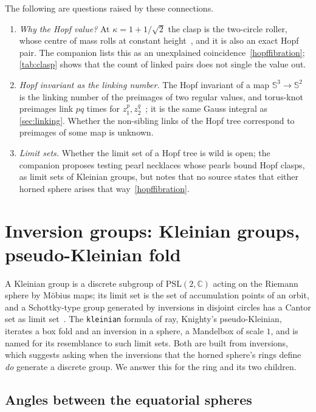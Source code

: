 \documentclass[11pt,a4paper]{article}
\theoremstyle{remark}
\newcommand{\C}{\mathbb{C}}
\newcommand{\Sph}{\mathbb{S}}
\newcommand{\code}[1]{\texttt{#1}}
\begin{document}
The following are questions raised by these connections.
\begin{enumerate}[leftmargin=*,itemsep=2pt]
\item \emph{Why the Hopf value?}  At $\kappa=1+1/\sqrt2$ the clasp is the two-circle roller, whose centre of mass rolls at constant height~\cite{wiki_oloid}, and it is also an exact Hopf pair.  The companion lists this as an unexplained coincidence~\ref{hopffibration}; \cref{tab:clasp} shows that the count of linked pairs does not single the value out.
\item \emph{Hopf invariant as the linking number.}  The Hopf invariant of a map $\Sph^3\to\Sph^2$ is the linking number of the preimages of two regular values, and torus-knot preimages link $pq$ times for $z_1^p,z_2^q$~\cite{hou2025}; it is the same Gauss integral as \cref{sec:linking}.  Whether the non-sibling links of the Hopf tree correspond to preimages of some map is unknown.
\item \emph{Limit sets.}  Whether the limit set of a Hopf tree is wild is open; the companion proposes testing pearl necklaces whose pearls bound Hopf clasps, as limit sets of Kleinian groups, but notes that no source states that either horned sphere arises that way~\ref{hopffibration}.
\end{enumerate}

\section{Inversion groups: Kleinian groups, pseudo-Kleinian fold}
\label{sec:kleinian}

A Kleinian group is a discrete subgroup of $\mathrm{PSL}(2,\C)$ acting on the Riemann sphere by M\"obius maps; its limit set is the set of accumulation points of an orbit, and a Schottky-type group generated by inversions in disjoint circles has a Cantor set as limit set~\cite{wiki_kleinian}.  The \code{kleinian} formula of ray, Knighty's pseudo-Kleinian, iterates a box fold and an inversion in a sphere, a Mandelbox of scale $1$, and is named for its resemblance to such limit sets.  Both are built from inversions, which suggests asking when the inversions that the horned sphere's rings define \emph{do} generate a discrete group.  We answer this for the ring and its two children.

\subsection{Angles between the equatorial spheres}
\end{document}
